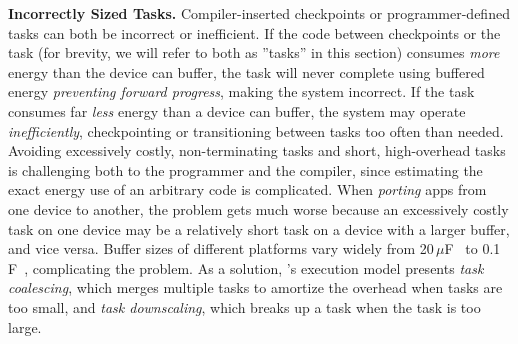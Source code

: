 \textbf{Incorrectly Sized Tasks.} Compiler-inserted checkpoints or programmer-defined tasks can both be incorrect or inefficient.
If the code between checkpoints or the task (for brevity, we will refer to both as ''tasks'' in this section) consumes {\em more} 
energy than the device can buffer, the task will never complete 
using buffered energy {\em preventing forward progress}, making the system incorrect. 
%
If the task consumes far {\em less} energy than a device can buffer, the system may operate {\em inefficiently},
checkpointing or transitioning between tasks too often than needed. 
%
Avoiding excessively costly, non-terminating tasks and short, high-overhead tasks is challenging both to the
programmer and the compiler, since estimating the exact energy use of an arbitrary code is complicated.
When {\em porting} apps from one device to another, the problem gets much worse because
an excessively costly task on one device may be a relatively short task on a device with a larger buffer, and vice versa. 
Buffer sizes of different platforms vary widely from 20\,$\mu $F~\cite{rodriguez_tbcs_2015} to 0.1\,F~\cite{moo},
complicating the problem.
%
As a solution, \sys's execution model presents {\em task coalescing}, which merges multiple tasks to amortize the overhead
when tasks are too small, and {\em task downscaling}, which breaks up a task when the task is too large. 

